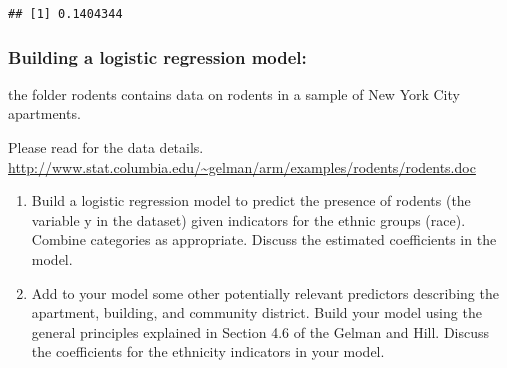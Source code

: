 \documentclass[]{article}
\newenvironment{Shaded}{\begin{snugshade}}{\end{snugshade}}
\newcommand{\KeywordTok}[1]{\textcolor[rgb]{0.13,0.29,0.53}{\textbf{#1}}}
\newcommand{\DecValTok}[1]{\textcolor[rgb]{0.00,0.00,0.81}{#1}}
\newcommand{\FloatTok}[1]{\textcolor[rgb]{0.00,0.00,0.81}{#1}}
\newcommand{\StringTok}[1]{\textcolor[rgb]{0.31,0.60,0.02}{#1}}
\newcommand{\CommentTok}[1]{\textcolor[rgb]{0.56,0.35,0.01}{\textit{#1}}}
\newcommand{\OperatorTok}[1]{\textcolor[rgb]{0.81,0.36,0.00}{\textbf{#1}}}
\newcommand{\NormalTok}[1]{#1}
\begin{document}
\begin{Shaded}
\end{Shaded}

\begin{verbatim}
## [1] 0.1404344
\end{verbatim}

\subsubsection{Building a logistic regression
model:}\label{building-a-logistic-regression-model}

the folder rodents contains data on rodents in a sample of New York City
apartments.

Please read for the data details.
\url{http://www.stat.columbia.edu/~gelman/arm/examples/rodents/rodents.doc}

\begin{enumerate}
\def\labelenumi{\arabic{enumi}.}
\item
  Build a logistic regression model to predict the presence of rodents
  (the variable y in the dataset) given indicators for the ethnic groups
  (race). Combine categories as appropriate. Discuss the estimated
  coefficients in the model.
\item
  Add to your model some other potentially relevant predictors
  describing the apartment, building, and community district. Build your
  model using the general principles explained in Section 4.6 of the
  Gelman and Hill. Discuss the coefficients for the ethnicity indicators
  in your model.
\end{enumerate}
\end{document}
